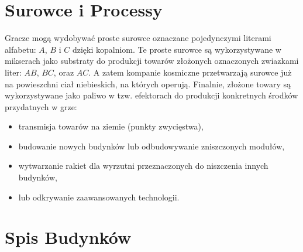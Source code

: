\documentclass[11pt,a4paper]{article}
\begin{document}
\section{Surowce i Processy}

Gracze mogą wydobywać proste surowce oznaczane pojedynczymi literami alfabetu: $A$, $B$ i $C$ dzięki kopalniom. Te proste surowce są wykorzystywane w mikserach jako substraty do produkcji towarów złożonych oznaczonych zwiazkami liter: $AB$, $BC$, oraz $AC$. A zatem kompanie kosmiczne przetwarzają surowce już na powieszchni ciał niebieskich, na których operują. Finalnie, złożone towary są wykorzystywane jako paliwo w tzw. efektorach do produkcji konkretnych środków przydatnych w grze:
\begin{itemize}
  \setlength{\parskip}{0pt}
  \setlength{\itemsep}{0pt plus 1pt}
\item transmisja towarów na ziemie (punkty zwycięstwa),
\item budowanie nowych budynków lub odbudowywanie zniszczonych modułów,
\item wytwarzanie rakiet dla wyrzutni przeznaczonych do niszczenia innych budynków,
\item lub odkrywanie zaawansowanych technologii.
\end{itemize}
\section{Spis Budynków}
\end{document}
